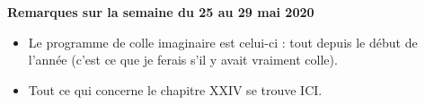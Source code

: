 \documentclass[12pt,a4paper]{article}
\begin{document}
% 
% 
% 
% 


\noindent\textbf{\bf Remarques sur la semaine du 25 au 29 mai 2020}
\begin{itemize}
\item Le programme de colle imaginaire est celui-ci : tout depuis le début de l'année (c'est ce que je ferais s'il y avait vraiment colle).
\item Tout ce qui concerne le chapitre XXIV se trouve ICI.\vspace{.4cm}
\end{itemize}
\end{document}

